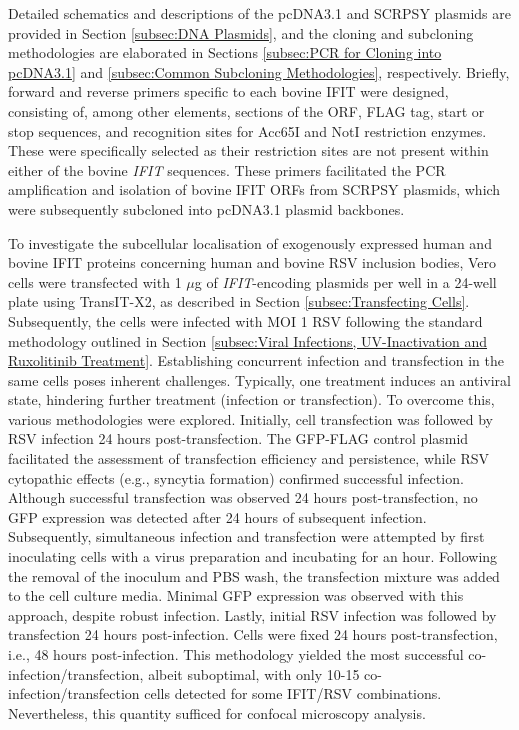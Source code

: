 Detailed schematics and descriptions of the pcDNA3.1 and SCRPSY plasmids are provided in Section \ref{subsec:DNA Plasmids}, and the cloning and subcloning methodologies are elaborated in Sections \ref{subsec:PCR for Cloning into pcDNA3.1} and \ref{subsec:Common Subcloning Methodologies}, respectively. Briefly, forward and reverse primers specific to each bovine IFIT were designed, consisting of, among other elements, sections of the ORF, FLAG tag, start or stop sequences, and recognition sites for Acc65I and NotI restriction enzymes. These were specifically selected as their restriction sites are not present within either of the bovine \textit{IFIT} sequences. These primers facilitated the PCR amplification and isolation of bovine IFIT ORFs from SCRPSY plasmids, which were subsequently subcloned into pcDNA3.1 plasmid backbones.

To investigate the subcellular localisation of exogenously expressed human and bovine IFIT proteins concerning human and bovine RSV inclusion bodies, Vero cells were transfected with 1 \(\mu\)g of \textit{IFIT}-encoding plasmids per well in a 24-well plate using TransIT-X2, as described in Section \ref{subsec:Transfecting Cells}. Subsequently, the cells were infected with MOI 1 RSV following the standard methodology outlined in Section \ref{subsec:Viral Infections, UV-Inactivation and Ruxolitinib Treatment}. Establishing concurrent infection and transfection in the same cells poses inherent challenges. Typically, one treatment induces an antiviral state, hindering further treatment (infection or transfection). To overcome this, various methodologies were explored. Initially, cell transfection was followed by RSV infection 24 hours post-transfection. The GFP-FLAG control plasmid facilitated the assessment of transfection efficiency and persistence, while RSV cytopathic effects (e.g., syncytia formation) confirmed successful infection. Although successful transfection was observed 24 hours post-transfection, no GFP expression was detected after 24 hours of subsequent infection. Subsequently, simultaneous infection and transfection were attempted by first inoculating cells with a virus preparation and incubating for an hour. Following the removal of the inoculum and PBS wash, the transfection mixture was added to the cell culture media. Minimal GFP expression was observed with this approach, despite robust infection. Lastly, initial RSV infection was followed by transfection 24 hours post-infection. Cells were fixed 24 hours post-transfection, i.e., 48 hours post-infection. This methodology yielded the most successful co-infection/transfection, albeit suboptimal, with only 10-15 co-infection/transfection cells detected for some IFIT/RSV combinations. Nevertheless, this quantity sufficed for confocal microscopy analysis.

